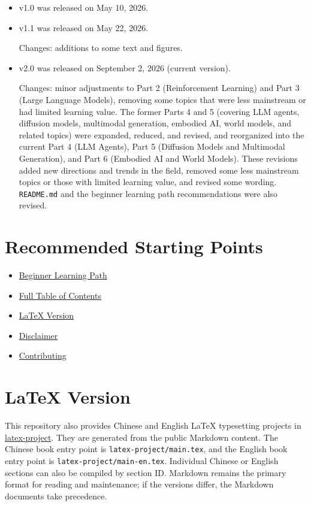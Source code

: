 \begin{itemize}
\item
  v1.0 was released on May 10, 2026.
\item
  v1.1 was released on May 22, 2026.

  Changes: additions to some text and figures.
\item
  v2.0 was released on September 2, 2026 (current version).

  Changes: minor adjustments to Part 2 (Reinforcement Learning) and Part 3 (Large Language Models), removing some topics that were less mainstream or had limited learning value. The former Parts 4 and 5 (covering LLM agents, diffusion models, multimodal generation, embodied AI, world models, and related topics) were expanded, reduced, and revised, and reorganized into the current Part 4 (LLM Agents), Part 5 (Diffusion Models and Multimodal Generation), and Part 6 (Embodied AI and World Models). These revisions added new directions and trends in the field, removed some less mainstream topics or those with limited learning value, and revised some wording. \texttt{README.md} and the beginner learning path recommendations were also revised.
\end{itemize}

\hypertarget{recommended-starting-points}{%
\section{Recommended Starting Points}\label{recommended-starting-points}}

\begin{itemize}
\tightlist
\item
  \href{BEGINNER_LEARNING_PATH_EN.md}{Beginner Learning Path}
\item
  \href{TABLE_OF_CONTENTS_EN.md}{Full Table of Contents}
\item
  \href{latex-project/README_EN.md}{LaTeX Version}
\item
  \href{DISCLAIMER_EN.md}{Disclaimer}
\item
  \href{CONTRIBUTING_EN.md}{Contributing}
\end{itemize}

\hypertarget{latex-version}{%
\section{LaTeX Version}\label{latex-version}}

This repository also provides Chinese and English LaTeX typesetting projects in \href{latex-project/README_EN.md}{latex-project}. They are generated from the public Markdown content. The Chinese book entry point is \texttt{latex-project/main.tex}, and the English book entry point is \texttt{latex-project/main-en.tex}. Individual Chinese or English sections can also be compiled by section ID. Markdown remains the primary format for reading and maintenance; if the versions differ, the Markdown documents take precedence.

